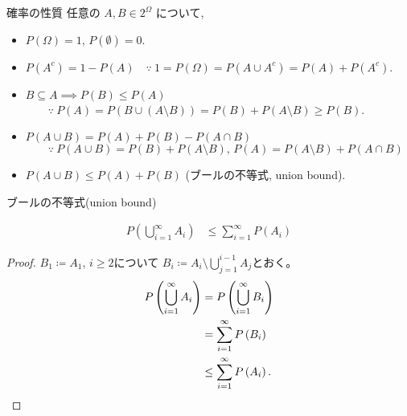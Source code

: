 \documentclass[lualatex,handout]{beamer}
\theoremstyle{definition}
\begin{document}
\begin{frame}{確率の性質}
任意の $A,B\in 2^\Omega$ について,
\begin{itemize}
\setlength{\itemsep}{1em}
\item $P(\Omega)=1,\,P(\emptyset)=0$.
\item $P(A^c) = 1 - P(A) \quad\because\ 1 = P(\Omega) = P(A\cup A^c) = P(A) + P(A^c)$.
\item $B\subseteq A\implies P(B) \le P(A)$\\
$\qquad \because\ P(A) = P(B\cup (A\setminus B)) = P(B) + P(A\setminus B)\ge P(B)$.
\item $P(A\cup B) = P(A) + P(B) - P(A\cap B)$\\
$\qquad \because\ P(A\cup B) = P(B) + P(A\setminus B),\, P(A) = P(A\setminus B) + P(A\cap B)$
\item $P(A\cup B) \le P(A) + P(B)$ (ブールの不等式, union bound).
\end{itemize}
\end{frame}

\begin{frame}{ブールの不等式(union bound)}
\begin{theorem}
\begin{align*}
P\left(\bigcup_{i=1}^\infty A_i\right) &\le \sum_{i=1}^\infty P(A_i)
\end{align*}
\end{theorem}
\begin{proof}
$B_1\coloneq A_1$, $i\ge 2$について $B_i\coloneq A_i\setminus \bigcup_{j=1}^{i-1} A_j$とおく。
\begin{align*}
P\left(\bigcup_{i=1}^\infty A_i\right) &= P\left(\bigcup_{i=1}^\infty B_i\right)\\
&= \sum_{i=1}^\infty P\left(B_i\right)\\
&\le \sum_{i=1}^\infty P\left(A_i\right).\qedhere
\end{align*}
\end{proof}
\end{frame}
\fi
\end{document}
